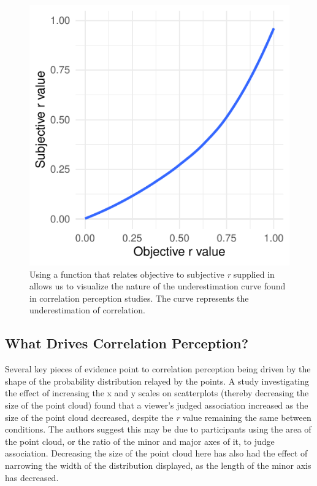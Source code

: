 \documentclass[preprint, 3p,
authoryear]{elsarticle} %
\begin{document}
\begin{figure}

\includegraphics{contrast_and_scatterplots_files/figure-latex/underestimation-curve-1} \hfill{}

\caption{\label{underestimation-curve}Using a function that relates objective to subjective \textit{r} supplied in \citep{rensink_2017} allows us to visualize the nature of the underestimation curve found in correlation perception studies. The curve represents the underestimation of correlation.}\label{fig:underestimation-curve}
\end{figure}

\hypertarget{what-drives-correlation-perception}{%
\subsection{What Drives Correlation
Perception?}\label{what-drives-correlation-perception}}

Several key pieces of evidence point to correlation perception being
driven by the shape of the probability distribution relayed by the
points. A study investigating the effect of increasing the x and y
scales on scatterplots (thereby decreasing the size of the point cloud)
\citep{cleveland_1982} found that a viewer's judged association
increased as the size of the point cloud decreased, despite the \emph{r}
value remaining the same between conditions. The authors suggest this
may be due to participants using the area of the point cloud, or the
ratio of the minor and major axes of it, to judge association.
Decreasing the size of the point cloud here has also had the effect of
narrowing the width of the distribution displayed, as the length of the
minor axis has decreased.
\end{document}
